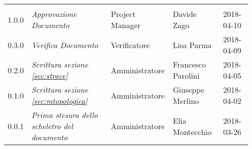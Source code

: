 \newpage 
\section*{}
\begin{table}[H]
	\centering
	\begin{tabular}{C{2cm}|C{4cm}|C{3cm}|C{3cm}|R{2cm}}
		
		 & & & & \\
		
		
			1.0.0  & \emph{Approvazione Documento} & Project Manager & Davide Zago &  2018-04-10 \\
		\hline
		
		0.3.0  & \emph{Verifica Documento} & Verificatore & Lisa Parma &  2018-04-09 \\
		\hline
		
		0.2.0 & \emph{Scrittura sezione \ref{sec:strace}} & Amministratore & Francesco Parolini &  2018-04-05 \\
		\hline
		
		0.1.0 & \emph{Scrittura sezione \ref{sec:mtopologica}} & Amministratore & Giuseppe Merlino &  2018-04-02 \\
		\hline
		
		
		0.0.1 & \emph{Prima stesura dello scheletro del documento} & Amministratore & Elia Montecchio &  2018-03-26 \\
		
		
	\end{tabular}
	
\end{table}


\clearpage